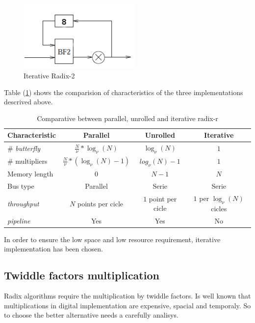 \documentclass[conference]{IEEEtran}
\begin{document}
\begin{figure}[htb!]
        \centering
        \includegraphics[width=6cm]{./figures/r2sBf.png}
        \caption{Iterative Radix-2}
        \label{fig:r2sBf}
\end{figure}

Table (\ref{table:radixcomp}) shows the comparision of characteristics of the three implementations descrived above.

\begin{table}[htb!]
\centering
\begin{tabular}{l c c c}
\textbf{Characteristic} & \textbf{Parallel} & \textbf{Unrolled} &
\textbf{Iterative}\\
\hline 
\# \textit{butterfly} & $\frac{N}{\nu}*\log_\nu(N)$ & $\log_\nu(N)$ & $1$ \\
\# multipliers & $\frac{N}{\nu}*(\log_\nu(N)-1)$ & $log_\nu(N)-1$ & $1$ \\
Memory length & $0$ & $N-1$ & $N$ \\
Bus type & Parallel & Serie & Serie \\
\textit{throughput} & $N$ points per cicle & $1$ point per cicle & $1$ per $\log_\nu(N)$
cicles\\
\textit{pipeline} & Yes & Yes & No\\
\hline
\end{tabular}
\caption{Comparative between parallel, unrolled and iterative radix-r}
\label{table:radixcomp}
\end{table}

In order to ensure the low space and low resource requirement, iterative implementation has been chosen.

\subsection{Twiddle factors multiplication}

Radix algorithms require the multiplication by twiddle factors. Is well known that multiplications in digital implementation are expensive, 
spacial and temporaly. So to choose the better alternative needs a carefully analisys.\\
\end{document}
